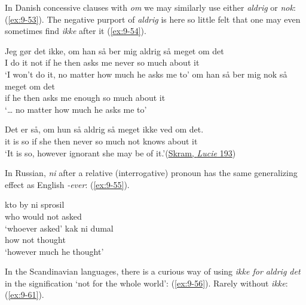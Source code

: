 In Danish concessive clauses with \textit{om} we may similarly use either \textit{aldrig} or \textit{nok}:  (\ref{ex:9-53}). The negative purport of \textit{aldrig} is here so little felt that one may even sometimes find \textit{ikke} after it (\ref{ex:9-54}).%

\ea \label{ex:9-53}
 \ea  \gll Jeg gør det ikke, om han så ber mig aldrig så meget om det\\
 I do it not if he then asks me never so much about it\\
 \glt `I won't do it, no matter how much he asks me to'
 \ex \gll {\dots} om han så ber mig nok så meget om det\\
 {} if he then asks me enough so much about it\\
 \glt `{\dots} no matter how much he asks me to'
\z
\z
{}

\ea \label{ex:9-54}
 \gll Det er så, om hun så aldrig så meget ikke ved om det.\\
 it is so if she then never so much not knows about it\\
\glt `It is so, however ignorant she may be of it.'\hfill(\href{https://www.bokselskap.no/boker/lucie/xix}{Skram, \textit{Lucie} 193})
\z
{}

In Russian, \textit{ni} after a relative (interrogative) pronoun has the same generalizing effect as English \textit{-ever}: (\ref{ex:9-55}).

\ea \label{ex:9-55}
 \ea  \gll kto by ni sprosil\\
 who would not asked\\
 \glt `whoever asked'
 \ex  \gll kak ni dumal\\
 how not thought\\
 \glt `however much he thought'\hfill\citep[152]{pedersen1916russisk} %
 \z
\z

In the Scandinavian languages, there is a curious way of using \textit{ikke for aldrig det} in the signification `not for the whole world': (\ref{ex:9-56}). Rarely without \textit{ikke}: (\ref{ex:9-61}).

